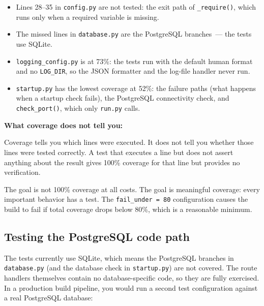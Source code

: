 \begin{itemize}
\tightlist
\item
  Lines 28--35 in \texttt{config.py} are not tested: the exit path of \texttt{\_require()}, which runs only when a required variable is missing.
\item
  The missed lines in \texttt{database.py} are the PostgreSQL branches~--- the tests use SQLite.
\item
  \texttt{logging\_config.py} is at 73\%: the tests run with the default human format and no \texttt{LOG\_DIR}, so the JSON formatter and the log-file handler never run.
\item
  \texttt{startup.py} has the lowest coverage at 52\%: the failure paths (what happens when a startup check fails), the PostgreSQL connectivity check, and \texttt{check\_port()}, which only \texttt{run.py} calls.
\end{itemize}

\noindent{}\textbf{What coverage does not tell you:}

Coverage tells you which lines were executed. It does not tell you whether those lines were tested correctly. A test that executes a line but does not assert anything about the result gives 100\% coverage for that line but provides no verification.

The goal is not 100\% coverage at all costs. The goal is meaningful coverage: every important behavior has a test. The \texttt{fail\_under\ =\ 80} configuration causes the build to fail if total coverage drops below 80\%, which is a reasonable minimum.

\subsection*{Testing the PostgreSQL code path}\label{17-build-process:testing-the-postgresql-code-path}

The tests currently use SQLite, which means the PostgreSQL branches in \texttt{database.py} (and the database check in \texttt{startup.py}) are not covered. The route handlers themselves contain no database-specific code, so they are fully exercised. In a production build pipeline, you would run a second test configuration against a real PostgreSQL database:

\begin{codebox}[short]

\begin{Shaded}
\begin{Highlighting}[]
\OperatorTok{=}
\end{Highlighting}
\end{Shaded}

\end{codebox}


